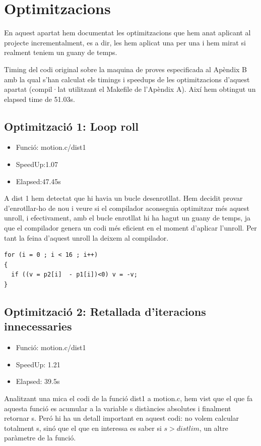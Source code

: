 

\chapter{Optimitzacions}

En aquest apartat hem documentat les optimitzacions que hem anat aplicant al projecte incrementalment, es a dir, les hem aplicat una per una i hem mirat si realment teniem un guany de temps. 

Timing del codi original sobre la maquina de proves especificada al Apèndix B amb la qual s'han calculat els timings i speedups de les optimitzacions d'aquest apartat (compil·lat utilitzant el Makefile de l'Apèndix A). Així hem obtingut un elapsed time de 51.03s.


\section{Optimitzaci\'o 1: Loop roll}
\begin{itemize}
\item{Funció: motion.c/dist1}
\item{SpeedUp:1.07}
\item{Elapsed:47.45s}
\end{itemize}

A dist 1 hem detectat que hi havia un bucle desenrotllat. Hem decidit provar d'enrotllar-ho de nou i veure si el compilador aconseguia optimitzar més aquest unroll, i efectivament, amb el bucle enrotllat hi ha hagut un guany de temps, ja que el compilador genera un codi més eficient en el moment d'aplicar l'unroll. Per tant la feina d'aquest unroll la deixem al compilador.

\begin{lstlisting}
for (i = 0 ; i < 16 ; i++)
{
  if ((v = p2[i]  - p1[i])<0) v = -v;
}
\end{lstlisting}
 
\section{Optimitzaci\'o 2: Retallada d'iteracions innecessaries}
\begin{itemize}
\item{Funció: motion.c/dist1}
\item{SpeedUp: 1.21}
\item{Elapsed: 39.5s}
\end{itemize}

Analitzant una mica el codi de la funció dist1 a motion.c, hem vist que el que fa aquesta funció es acumular a la variable s distàncies absolutes i finalment retornar s. Peró hi ha un detall important en aquest codi: no volem calcular totalment s, sinó que el que en interessa es saber si $s>distlim$, un altre paràmetre de la funció.


